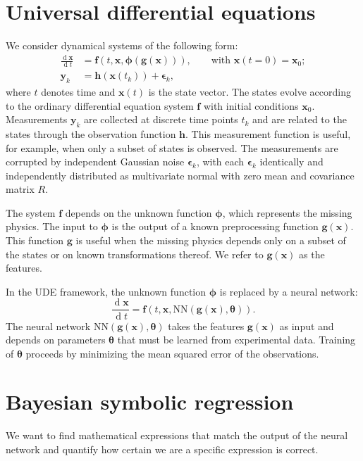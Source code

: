 \documentclass{ifacconf}
\DeclareMathOperator{\dd}{\mathrm{d}}
\begin{document}
	\section{Universal differential equations}
	We consider dynamical systems of the following form:
	\begin{equation}\label{eq:system}
		\begin{aligned}
			\frac{\dd \bm x}{\dd t} &= \bm f(t,\bm x,\bm \phi(\bm g(\bm x))), \qquad \text{with } \bm x(t=0) = \bm x_0;\\
			\bm y_k &= \bm h(\bm x(t_k)) + \bm \epsilon_k,
		\end{aligned}
	\end{equation}
	where $t$ denotes time and $\bm x(t)$ is the state vector.
	The states evolve according to the ordinary differential equation system $\bm f$ with initial conditions $\bm x_0$.
	Measurements $\bm y_k$ are collected at discrete time points $t_k$ and are related to the states through the observation function $\bm h$.
	This measurement function is useful, for example, when only a subset of states is observed.
	The measurements are corrupted by independent Gaussian noise $\bm \epsilon_k$, with each $\bm \epsilon_k$ identically and independently distributed as multivariate normal with zero mean and covariance matrix $R$.
	
	The system $\bm f$ depends on the unknown function $\bm \phi$, which represents the missing physics.
	The input to $\bm \phi$ is the output of a known preprocessing function $\bm g(\bm x)$.
	This function $\bm g$ is useful when the missing physics depends only on a subset of the states or on known transformations thereof.
	We refer to $\bm g(\bm x)$ as the features.
	
	In the UDE framework, the unknown function $\bm \phi$ is replaced by a neural network:
	\begin{equation}\label{eq:UDE}
		\frac{\dd \bm x}{\dd t} = \bm f(t,\bm x,\text{NN}(\bm g(\bm x), \bm \theta)).
	\end{equation}
	The neural network $\text{NN}(\bm g(\bm x), \bm \theta)$ takes the features $\bm g(\bm x)$ as input and depends on parameters $\bm \theta$ that must be learned from experimental data.
	Training of $\bm \theta$ proceeds by minimizing the mean squared error of the observations.

	\section{Bayesian symbolic regression}
	We want to find mathematical expressions that match the output of the neural network and quantify how certain we are a specific expression is correct.
	
\end{document}
